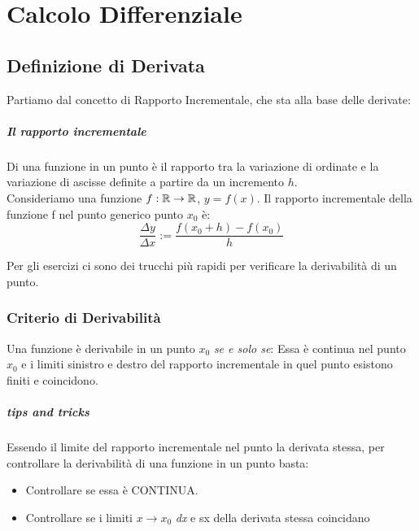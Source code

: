 
\chapter{Calcolo Differenziale}
\section{Definizione di Derivata}
Partiamo dal concetto di Rapporto Incrementale, che sta alla base delle derivate:
\paragraph*{Il rapporto incrementale}
Di una funzione in un punto è il rapporto tra la variazione di ordinate e la variazione di ascisse definite a partire da un incremento $h$.
\\Consideriamo una funzione $f:\mathbb{R}\to\mathbb{R}$, $y=f(x)$.
Il rapporto incrementale della funzione f nel punto generico punto $x_0$ è:
\[
	\frac{\Delta y}{\Delta x} := \frac{f(x_0+h)-f(x_0)}{h}	
\]

Per gli esercizi ci sono dei trucchi più rapidi per verificare la derivabilità di un punto.


\subsection{Criterio di Derivabilità}
Una funzione è derivabile in un punto $x_0$ \emph{se e solo se}:
Essa è continua nel punto $x_0$ e i limiti sinistro e destro del rapporto incrementale in quel punto esistono finiti e coincidono.

\paragraph*{tips and tricks}
Essendo il limite del rapporto incrementale nel punto la derivata stessa, 
per controllare la derivabilità di una funzione in un punto basta:
\begin{itemize}
	\item Controllare se essa è CONTINUA.
	\item Controllare se i limiti $x \to x_0$ \emph{dx} e {sx} della derivata stessa coincidano
\end{itemize}



